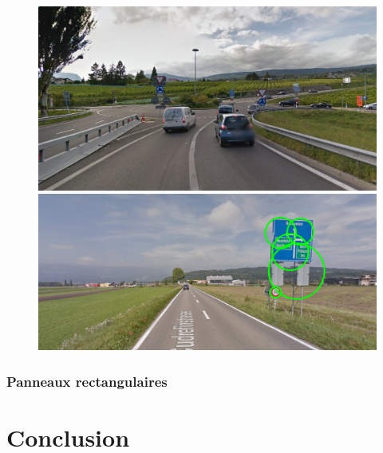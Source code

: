 \documentclass[a4paper,10pt,openany,oneside]{report}
\begin{document}
\begin{figure}[!h]
\centering
\includegraphics[width=\textwidth]{../img/29-hough_circles.png}
\includegraphics[width=\textwidth]{../img/69-hough_circles.png}
\end{figure}
\pagebreak
\subsection{Panneaux rectangulaires}


\chapter{Conclusion}
\end{document}
